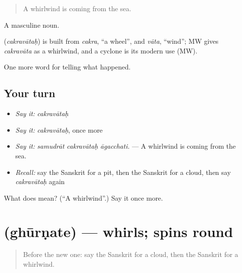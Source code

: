 \begin{quote}
A whirlwind is coming from the sea.
\end{quote}

A masculine noun.

\begin{cousinweb}
\textbf{} (\emph{cakravātaḥ}) is built from \emph{cakra}, \textquotedblleft{}a wheel\textquotedblright{}, and \emph{vāta}, \textquotedblleft{}wind\textquotedblright{}; MW gives \emph{cakravāta} as a whirlwind, and a cyclone is its modern use (MW).
\end{cousinweb}

\begin{grammarlens}[title={What you've built}]
One more word for telling what happened.
\end{grammarlens}

\subsection*{Your turn}
\begin{itemize}
\raggedright
  \item \emph{Say it:} \emph{cakravātaḥ}
  \item \emph{Say it:} \emph{cakravātaḥ}, once more
  \item \emph{Say it:} \emph{samudrāt cakravātaḥ āgacchati.} — A whirlwind is coming from the sea.
  \item \emph{Recall:} say the Sanskrit for a pit, then the Sanskrit for a cloud, then say \emph{cakravātaḥ} again
\end{itemize}

\begin{tcolorbox}[breakable,colback=teal!4,colframe=teal!35!black,title={Before you move on}]
What does  mean? (\textquotedblleft{}A whirlwind\textquotedblright{}.) Say it once more.
\end{tcolorbox}
\section[\texorpdfstring{\sk{घूर्णते} (ghūrṇate)}{घूर्णते (ghūrṇate)}]{ (ghūrṇate) — whirls; spins round}

\label{lesson:SA-C301-ghurnate}



\begin{quote}
Before the new one: say the Sanskrit for a cloud, then the Sanskrit for a whirlwind.
\end{quote}


